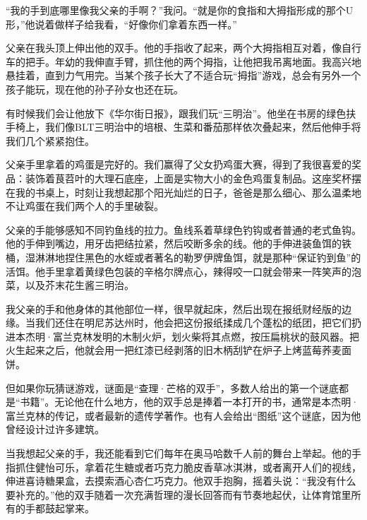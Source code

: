 “我的手到底哪里像我父亲的手啊？”我问。“就是你的食指和大拇指形成的那个U形，”他说着做样子给我看，“好像你们拿着东西一样。”
\par

父亲在我头顶上伸出他的双手。他的手指收了起来，两个大拇指相互对着，像自行车的把手。年幼的我伸直手臂，抓住他的两个拇指，让他把我吊离地面。我高兴地悬挂着，直到力气用完。当某个孩子长大了不适合玩“拇指”游戏，总会有另外一个孩子能玩，现在他的孙子孙女也还在玩。
\par

有时候我们会让他放下《华尔街日报》，跟我们玩“三明治”。他坐在书房的绿色扶手椅上，我们像BLT三明治中的培根、生菜和番茄那样依次叠起来，然后他伸手将我们几个紧紧抱住。
\par

父亲手里拿着的鸡蛋是完好的。我们赢得了父女扔鸡蛋大赛，得到了我很喜爱的奖品：装饰着茛苕叶的大理石底座，上面是实物大小的金色鸡蛋复制品。这座奖杯摆在我的书桌上，时刻让我想起那个阳光灿烂的日子，爸爸是那么细心、那么温柔地不让鸡蛋在我们两个人的手里破裂。
\par

父亲的手能够感知不同钓鱼线的拉力。鱼线系着草绿色钓钩或者普通的老式鱼钩。他的手伸到嘴边，用牙齿把结拉紧，然后咬断多余的线。他的手伸进装鱼饵的铁桶，湿淋淋地捏住黑色的水蛭或者著名的勒罗伊牌鱼饵，就是那种“保证钓到鱼”的活饵。他手里拿着黄绿色包装的辛格尔牌点心，辣得咬一口就会带来一阵笑声的泡菜，以及芥末花生酱三明治。
\par

我父亲的手和他身体的其他部位一样，很早就起床，然后出现在报纸财经版的边缘。当我们还住在明尼苏达州时，他会把这份报纸揉成几个蓬松的纸团，把它们扔进本杰明·富兰克林发明的木制火炉，划火柴将其点燃，按压扁桃状的鼓风器。把火生起来之后，他就会用一把红漆已经剥落的旧木柄刮铲在炉子上烤蓝莓荞麦面饼。
\par

但如果你玩猜谜游戏，谜面是“查理·芒格的双手”，多数人给出的第一个谜底都是“书籍”。无论他在什么地方，他的双手总是捧着一本打开的书，通常是本杰明·富兰克林的传记，或者最新的遗传学著作。也有人会给出“图纸”这个谜底，因为他曾经设计过许多建筑。
\par

当我想起父亲的手，我还能看到它们每年在奥马哈数千人前的舞台上举起。他的手指抓住健怡可乐，拿着花生糖或者巧克力脆皮香草冰淇淋，或者离开人们的视线，伸进喜诗糖果盒，去摸索酒心杏仁巧克力。他双手抱胸，摇着头说：“我没有什么要补充的。”他的双手随着一次充满哲理的漫长回答而有节奏地起伏，让体育馆里所有的手都鼓起掌来。
\par

